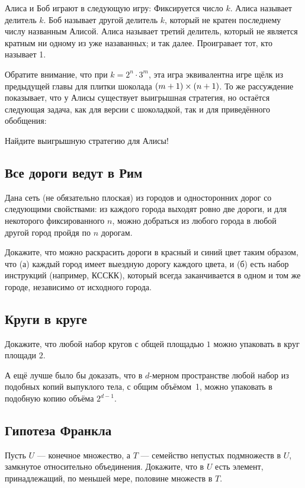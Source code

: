 Алиса и Боб играют в следующую игру:
Фиксируется число $k$.
Алиса называет делитель $k$.
Боб называет другой делитель $k$, который не кратен последнему числу названным Алисой.
Алиса называет третий делитель, который не является кратным ни одному из уже назаванных; 
и так далее.
Проигравает тот, кто называет 1.

Обратите внимание, что при $k=2^{n}\cdot 3^{m}$, эта игра эквивалентна игре щёлк из предыдущей главы для плитки шоколада $(m+1)\z\times (n+1)$.
То же рассуждение показывает, что у Алисы существует выигрышная стратегия, но остаётся следующая задача, как для версии с шоколадкой, так и для приведённого обобщения:

Найдите выигрышную стратегию для Алисы!

\subsection*{Все дороги ведут в Рим}

Дана сеть (не обязательно плоская) из городов и односторонних дорог со следующими свойствами:
из каждого города выходят ровно две дороги, и для некоторого фиксированного $n$, можно добраться из любого города в любой другой город пройдя по $n$ дорогам.

Докажите, что можно раскрасить дороги в красный и синий цвет таким образом, что (а) каждый город имеет выездную дорогу каждого цвета, и (б) есть набор инструкций (например, КССКК), который всегда заканчивается в одном и том же городе, независимо от исходного города.

\subsection*{Круги в круге}

Докажите, что любой набор кругов с общей площадью $1$ можно упаковать в круг площади $2$.

А ещё лучше было бы доказать, что в $d$-мерном пространстве любой набор из подобных копий выпуклого тела, с общим объёмом~1, можно упаковать в подобную копию объёма $2^{d-1}$.

\subsection*{Гипотеза Франкла}

Пусть $U$ --- конечное множество, а $T$ --- семейство непустых подмножеств в $U$, замкнутое относительно объединения.
Докажите, что в $U$ есть элемент, принадлежащий, по меньшей мере, половине множеств в $T$.
